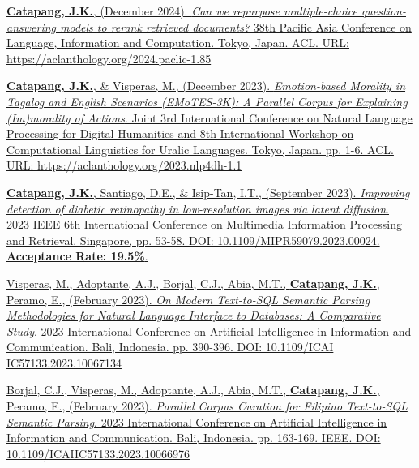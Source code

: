 \documentclass[margin]{res}
\begin{document}
\begin{resume}
\vspace{-12pt}

 \href{https://aclanthology.org/2024.paclic-1.85}{\textbf{Catapang, J.K.}, (December 2024). \textit{Can we repurpose multiple-choice question-answering models to rerank retrieved documents?} 38th Pacific Asia Conference on Language, Information and Computation. Tokyo, Japan. ACL. URL: https://aclanthology.org/2024.paclic-1.85}

\vspace{-12pt}

 \href{https://aclanthology.org/2023.nlp4dh-1.1/}{\textbf{Catapang, J.K.}, \& Visperas, M., (December 2023). \textit{Emotion-based Morality in Tagalog and English Scenarios (EMoTES-3K): A Parallel Corpus for Explaining (Im)morality of Actions}. Joint 3rd International Conference on Natural Language Processing for Digital Humanities and 8th International Workshop on Computational Linguistics for Uralic Languages. Tokyo, Japan. pp. 1-6. ACL. URL: https://aclanthology.org/2023.nlp4dh-1.1}

\vspace{-12pt}

 \href{https://ieeexplore.ieee.org/document/10254404}{\textbf{Catapang, J.K.}, Santiago, D.E., \& Isip-Tan, I.T., (September 2023). \textit{Improving detection of diabetic retinopathy in low-resolution images via latent diffusion}. 2023 IEEE 6th International Conference on Multimedia Information Processing and Retrieval. Singapore, pp. 53-58. DOI: 10.1109/MIPR59079.2023.00024. \textbf{Acceptance Rate: 19.5\%}.}

\vspace{-12pt}

 \href{https://ieeexplore.ieee.org/document/10067134}{Visperas, M., Adoptante, A.J., Borjal, C.J., Abia, M.T., \textbf{Catapang, J.K.}, Peramo, E., (February 2023). \textit{On Modern Text-to-SQL Semantic Parsing Methodologies for Natural Language Interface to Databases: A Comparative Study}. 2023 International Conference on Artificial Intelligence in Information and Communication. Bali, Indonesia. pp. 390-396. DOI: 10.1109/ICAI IC57133.2023.10067134}

\vspace{-12pt}

 \href{https://ieeexplore.ieee.org/document/10066976}{Borjal, C.J., Visperas, M., Adoptante, A.J., Abia, M.T., \textbf{Catapang, J.K.}, Peramo, E., (February 2023). \textit{Parallel Corpus Curation for Filipino Text-to-SQL Semantic Parsing}. 2023 International Conference on Artificial Intelligence in Information and Communication. Bali, Indonesia. pp. 163-169. IEEE. DOI: 10.1109/ICAIIC57133.2023.10066976}


\end{resume}
\end{document}
